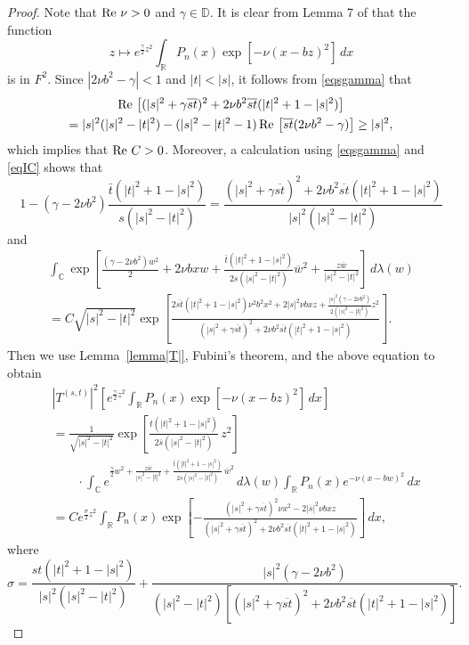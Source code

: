 \documentclass[reqno]{amsart}
\newcommand{\R}{{\mathbb R}}
\newcommand{\C}{{\mathbb C}}
\newcommand{\D}{{\mathbb D}}
\newcommand{\inr}{\int_{\R}}
\newcommand{\inc}{\int_{\C}}
\DeclareMathOperator{\re}{{\rm Re}\,}
\begin{document}
\begin{proof}
Note that $\re\nu>0$ and $\gamma\in\D$. It is clear from Lemma 7
of \cite{DZ3} that the function
$$z\mapsto e^{\frac{\gamma}{2}z^2}\inr P_n(x)
\exp\left[-\nu\left(x-bz\right)^2\right]\,dx$$
is in $F^2$. Since $|2\nu b^2-\gamma|<1$ and $|t|<|s|$,
it follows from \eqref{eqsgamma} that
\begin{multline}\label{eqrenu}
\re\left[(|s|^2+\gamma{\overline{st}})^2+2\nu b^2{\overline{st}}
(|t|^2+1-|s|^2)\right]\\
=|s|^2(|s|^2-|t|^2)-(|s|^2-|t|^2-1)\re\left[{\overline{st}}
(2\nu b^2-\gamma)\right]\geq |s|^2,
\end{multline}
which implies that $\re C>0$. Moreover, a calculation using \eqref{eqsgamma}
and \eqref{eqIC} shows that
$$1-(\gamma- 2\nu b^2)
\frac{\bar t(|t|^2+1-|s|^2)}{s(|s|^2-|t|^2)}
=\frac{(|s|^2+\gamma{\overline{st}})^2+2\nu
b^2{\overline{st}}(|t|^2+1-|s|^2)}{|s|^2(|s|^2-|t|^2)}$$
and
\begin{multline*}
\inc\exp\left[\frac{(\gamma- 2\nu b^2) w^2 }{2}+2\nu bxw+
\frac{\bar t(|t|^2+1-|s|^2)}{2s(|s|^2-|t|^2)}\overline{w}^2+
\frac{ z\overline{w}}{|s|^2-|t|^2}\right]\,d\lambda(w)\\[8pt]
=C\sqrt{|s|^2-|t|^2}\exp\left[\frac{2\overline{st}(|t|^2+1-|s|^2)
\nu^2 b^2x^2+2|s|^2\nu b x z+\frac{|s|^2(\gamma- 2\nu b^2)}
{2(|s|^2-|t|^2)}z^2}{(|s|^2+\gamma{\overline{st}})^2+2\nu
b^2{\overline{st}}(|t|^2+1-|s|^2)}\right].
\end{multline*}
Then we use Lemma~\ref{lemma|T|}, Fubini's theorem, and the above
equation to obtain
\begin{align}\label{eq|T|P}
&\left|T^{(s,t)}\right|^2\left[e^{\frac{\gamma}{2}z^2}
\inr P_n(x)\exp\left[-\nu\left(x-bz\right)^2\right]\,dx\right]\nonumber\\
    &=\frac{1}{\sqrt{|s|^2-|t|^2}}\exp\left[\frac{t(|t|^2+1-|s|^2)}{2\overline{s}(|s|^2-|t|^2)}\,z^2\right]\nonumber\\
   & \qquad \cdot \inc e^{\frac{\gamma}{2}w^2+\frac{z\overline{w}}{{|s|^2-|t|^2}}+
\frac{\bar t(|t|^2+1-|s|^2)}{2s(|s|^2-|t|^2)}\,\overline w^2}\,d\lambda(w)\inr P_n(x)e^{-\nu\left(x-bw\right)^2}\,dx\nonumber\\
&= Ce^{\frac{\sigma}{2}z^2}\inr P_n(x)\exp\left[-\frac{(|s|^2+
\gamma{\overline{st}})^2\nu x^2-2|s|^2\nu b x z}{(|s|^2+
\gamma{\overline{st}})^2+2\nu b^2{\overline{st}}
(|t|^2+1-|s|^2)}\right]\,dx,
\end{align}
where
$$\sigma=\frac{st(|t|^2+1-|s|^2)}{|s|^2(|s|^2-|t|^2)}+
\frac{|s|^2(\gamma- 2\nu b^2)}{(|s|^2-|t|^2)\left[(|s|^2+\gamma
{\overline{st}})^2+2\nu b^2{\overline{st}}(|t|^2+1-|s|^2)\right]}.$$


\end{proof}
\end{document}
